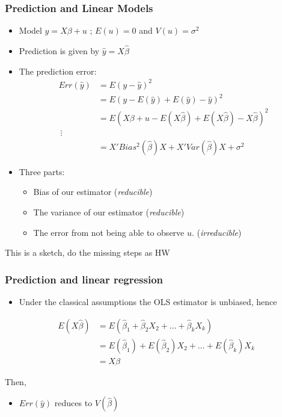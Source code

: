 \documentclass[
  shownotes,
  xcolor={svgnames},
  hyperref={colorlinks,citecolor=DarkBlue,linkcolor=DarkRed,urlcolor=DarkBlue}
  , aspectratio=169]{beamer}
\begin{document}
\begin{frame}
\frametitle{Prediction and Linear Models}

\begin{itemize}
\item Model $y = X\beta + u$ ; $E(u)=0$ and $V(u) = \sigma^2$
\item Prediction is given by $\hat{y} = X\hat{\beta}$
\item The prediction error:
\begin{align}
Err(\hat y) &= E\left(y-\hat y\right)^2 \\  
        &= E\left(y- E(\hat y) + E(\hat y) - \hat y\right)^2  \\
        &= E\left(X\beta + u- E(X\hat{\beta}) + E(X\hat{\beta}) - X\hat{\beta} \right)^2  \\\
        \vdots \\
        &= X' Bias^2\left(\hat \beta \right)X +  X'Var( \hat \beta)X  + \sigma^2
\end{align}
\item Three parts:
\begin{itemize}
  \item  Bias of our estimator (\emph{reducible})
  \item  The variance of our estimator (\emph{reducible})
  \item  The error from not being able to observe $u$. (\emph{irreducible})
\end{itemize}

\end{itemize}
\medskip
{\tiny This is a sketch, do the missing steps as HW}

\end{frame}

\begin{frame}
\frametitle{Prediction and linear regression}

\begin{itemize}
  \item Under the classical assumptions the OLS estimator is unbiased, hence 
\end{itemize}

\begin{align}
  E( X \hat \beta)&= E(\hat{\beta}_1 + \hat{\beta}_2 X_2 + \dots + \hat{\beta}_k X_k) \\ 
  &= E(\hat{\beta}_1) + E(\hat{\beta}_2) X_2 + \dots + E(\hat{\beta}_k) X_k  \\ 
  &= X \beta
\end{align}


Then, 

\begin{itemize}
  \item $Err(\hat y)$ reduces to  $V(\hat \beta)$
\end{itemize} 


\end{frame}
\end{document}
